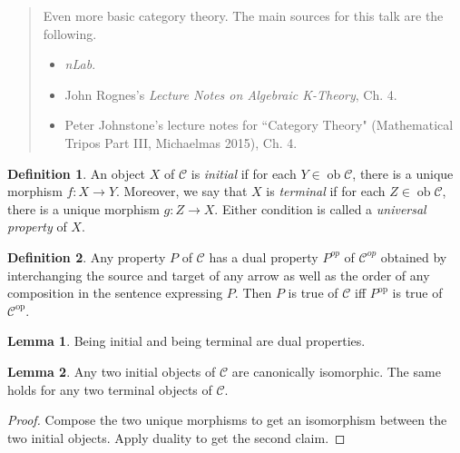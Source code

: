 \documentclass[10pt,letterpaper,cm]{nupset}
\theoremstyle{definition}
\newtheorem*{definition}{Definition}
\newtheorem{lemma}{Lemma}
\newcommand{\1}{\mathbf{1}}
\renewcommand{\c}{\mathscr{C}}
\newcommand{\0}{\vec 0}
\DeclareMathOperator{\op}{op}
\DeclareMathOperator{\ob}{ob}
\begin{document}
\begin{abstract}
Even more basic category theory. The main sources for this talk are the following.
\begin{itemize}
\item \textit{nLab}.
\item John Rognes's \textit{Lecture Notes on Algebraic K-Theory}, Ch. 4.
\item Peter Johnstone's lecture notes for ``Category Theory" (Mathematical Tripos Part III, Michaelmas 2015), Ch. 4.
\end{itemize}
\end{abstract}

\begin{definition}
An object $X$ of $\c$ is \textit{initial} if for each $Y \in \ob \c$, there is a unique morphism $f : X \to Y$. Moreover, we say that $X$ is \textit{terminal} if for each $Z \in \ob \c$, there is a unique morphism $g : Z \to X$. Either condition is called a \textit{universal property} of $X$.
\end{definition}

\begin{definition}
Any property $P$ of $\c$ has a dual property $P^{op}$ of $\c^{op}$ obtained by interchanging the source and target of any arrow as well as the order of any composition in the sentence expressing $P$. Then $P$ is true of $\c$ iff $P^{\op}$ is true of $\c^{\op}$.
\end{definition}

\begin{lemma}
Being initial and being terminal are dual properties.
\end{lemma}

\begin{lemma}
Any two initial objects of $\c$ are canonically isomorphic. The same holds for any two terminal objects of $\c$.
\end{lemma}
\begin{proof}
Compose the two unique morphisms to get an isomorphism between the two initial objects. Apply duality to get the second claim.
\end{proof}
\end{document}
